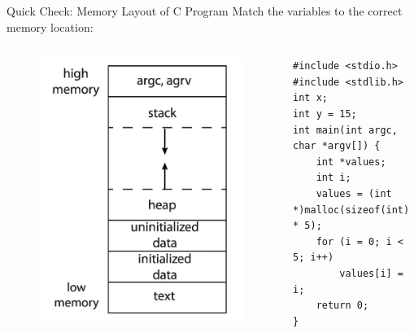 \begin{frame}[fragile=singleslide,containsverbatim]{Quick Check: Memory Layout of C Program}
	Match the variables to the correct memory location:
	\begin{columns}
		\begin{column}{0.3\textwidth}
			\begin{figure}[H]
				\centering
				\includegraphics[width=\textwidth]{day3/img/mem-layout.png}
			\end{figure}
		\end{column}
		\begin{column}{0.7\textwidth}
			\begin{verbatim}
#include <stdio.h>
#include <stdlib.h>
int x;
int y = 15;
int main(int argc, char *argv[]) {
    int *values;
    int i;
    values = (int *)malloc(sizeof(int) * 5);
    for (i = 0; i < 5; i++)
        values[i] = i;
    return 0;
}
        \end{verbatim}
		\end{column}
	\end{columns}
\end{frame}

